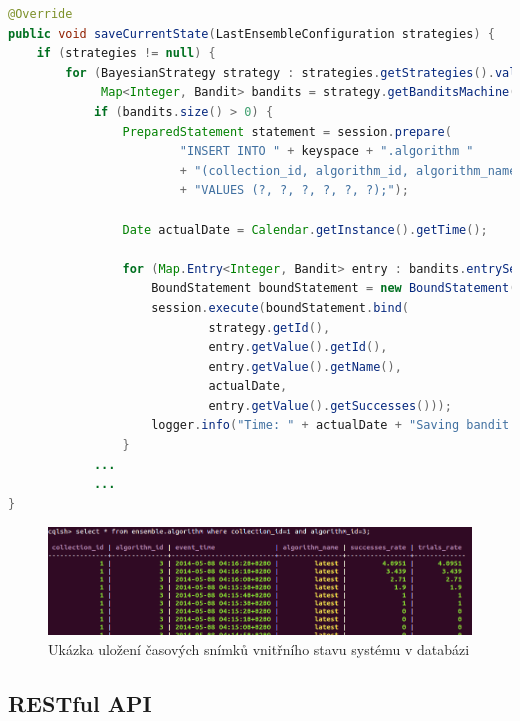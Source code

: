 \documentclass[thesis=M,czech]{FITthesis}[2014/05/07]
\begin{document}
\begin{lstlisting}[language=java]
@Override
public void saveCurrentState(LastEnsembleConfiguration strategies) {
    if (strategies != null) {
        for (BayesianStrategy strategy : strategies.getStrategies().values()) {
             Map<Integer, Bandit> bandits = strategy.getBanditsMachine().getBanditList();
            if (bandits.size() > 0) {
                PreparedStatement statement = session.prepare(
                        "INSERT INTO " + keyspace + ".algorithm "
                        + "(collection_id, algorithm_id, algorithm_name, event_time, trials_rate, successes_rate) "
                        + "VALUES (?, ?, ?, ?, ?, ?);");

                Date actualDate = Calendar.getInstance().getTime();

                for (Map.Entry<Integer, Bandit> entry : bandits.entrySet()) {
                    BoundStatement boundStatement = new BoundStatement(statement);
                    session.execute(boundStatement.bind(
                            strategy.getId(),
                            entry.getValue().getId(),
                            entry.getValue().getName(),
                            actualDate,
                            entry.getValue().getSuccesses()));
                    logger.info("Time: " + actualDate + "Saving bandit with ID " + entry.getValue().getName() + " into collection : " + strategy.getCollectionId());
                }
			...
			...			
}
\end{lstlisting}

\begin{figure}\centering
	\includegraphics[width=1.0\textwidth]{obr/cassandra.png}
 	\caption[Ukázka uložení časových snímků vnitřního stavu systému v databázi]{Ukázka uložení časových snímků vnitřního stavu systému v databázi}\label{fig:plista}
\end{figure}	

\subsection{RESTful API}
\label{sub:restapi}
\end{document}
